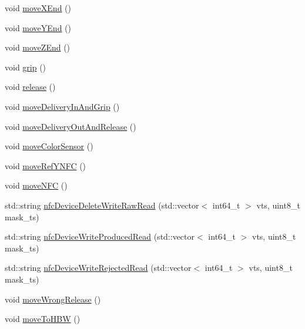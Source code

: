 \begin{DoxyCompactItemize}
void \hyperlink{classft_1_1_txt_vacuum_gripper_robot_a1c0f103a3ba54956d0be3b554687fe5b}{move\+X\+End} ()
\item 
void \hyperlink{classft_1_1_txt_vacuum_gripper_robot_a2294a0fbd841b3ab0355a5ab4d2955b6}{move\+Y\+End} ()
\item 
void \hyperlink{classft_1_1_txt_vacuum_gripper_robot_a74e0827b551f9d40b0c508e8f0d40ba0}{move\+Z\+End} ()
\item 
void \hyperlink{classft_1_1_txt_vacuum_gripper_robot_a7b261972e7b7c8bc9a9f57399b16ad0b}{grip} ()
\item 
void \hyperlink{classft_1_1_txt_vacuum_gripper_robot_af7565ff7a32d4967d3ec2aeac5c4fdc1}{release} ()
\item 
void \hyperlink{classft_1_1_txt_vacuum_gripper_robot_af8f27ff7ab32d50fe58ab1476392ab35}{move\+Delivery\+In\+And\+Grip} ()
\item 
void \hyperlink{classft_1_1_txt_vacuum_gripper_robot_aa60e08d7b10802cbfd1170c3cdb768d9}{move\+Delivery\+Out\+And\+Release} ()
\item 
void \hyperlink{classft_1_1_txt_vacuum_gripper_robot_ae3b7369fd88461e9e4003386664f3d43}{move\+Color\+Sensor} ()
\item 
void \hyperlink{classft_1_1_txt_vacuum_gripper_robot_a82cf9dd24902a3e3dff07548b39a1623}{move\+Ref\+Y\+N\+FC} ()
\item 
void \hyperlink{classft_1_1_txt_vacuum_gripper_robot_ac96887c8baeeb28f2928ab1e928b1e92}{move\+N\+FC} ()
\item 
std\+::string \hyperlink{classft_1_1_txt_vacuum_gripper_robot_a1978708ca213ed92e2033ce4b09579dd}{nfc\+Device\+Delete\+Write\+Raw\+Read} (std\+::vector$<$ int64\+\_\+t $>$ vts, uint8\+\_\+t mask\+\_\+ts)
\item 
std\+::string \hyperlink{classft_1_1_txt_vacuum_gripper_robot_a853a6ea40836bd2f2433a050e75cacc2}{nfc\+Device\+Write\+Produced\+Read} (std\+::vector$<$ int64\+\_\+t $>$ vts, uint8\+\_\+t mask\+\_\+ts)
\item 
std\+::string \hyperlink{classft_1_1_txt_vacuum_gripper_robot_aeb0103b0fb8a3f5557401a6c47e38ca3}{nfc\+Device\+Write\+Rejected\+Read} (std\+::vector$<$ int64\+\_\+t $>$ vts, uint8\+\_\+t mask\+\_\+ts)
\item 
void \hyperlink{classft_1_1_txt_vacuum_gripper_robot_a807828a888c228bff9d33d399c37a288}{move\+Wrong\+Release} ()
\item 
void \hyperlink{classft_1_1_txt_vacuum_gripper_robot_abd051a440570bc90759479aaeaa82fa5}{move\+To\+H\+BW} ()
\item 

\end{DoxyCompactItemize}
